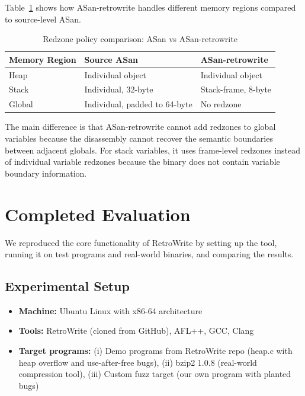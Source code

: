 \documentclass[10pt,a4paper]{article}
\begin{document}
Table~\ref{tab:asan_policy} shows how ASan-retrowrite handles different memory regions compared to source-level ASan.

\begin{table}[H]
\centering
\caption{Redzone policy comparison: ASan vs ASan-retrowrite}
\label{tab:asan_policy}
\begin{tabular}{lll}
\toprule
\textbf{Memory Region} & \textbf{Source ASan} & \textbf{ASan-retrowrite} \\
\midrule
\rowcolor{rowgray} Heap & Individual object & Individual object \\
Stack & Individual, 32-byte & Stack-frame, 8-byte \\
\rowcolor{rowgray} Global & Individual, padded to 64-byte & No redzone \\
\bottomrule
\end{tabular}
\end{table}

The main difference is that ASan-retrowrite cannot add redzones to global variables because the disassembly cannot recover the semantic boundaries between adjacent globals. For stack variables, it uses frame-level redzones instead of individual variable redzones because the binary does not contain variable boundary information.

\section{Completed Evaluation}

We reproduced the core functionality of RetroWrite by setting up the tool, running it on test programs and real-world binaries, and comparing the results.

\subsection{Experimental Setup}

\begin{itemize}
    \item \textbf{Machine:} Ubuntu Linux with x86-64 architecture
    \item \textbf{Tools:} RetroWrite (cloned from GitHub), AFL++, GCC, Clang
    \item \textbf{Target programs:} (i) Demo programs from RetroWrite repo (heap.c with heap overflow and use-after-free bugs), (ii) bzip2 1.0.8 (real-world compression tool), (iii) Custom fuzz target (our own program with planted bugs)
\end{itemize}
\end{document}
